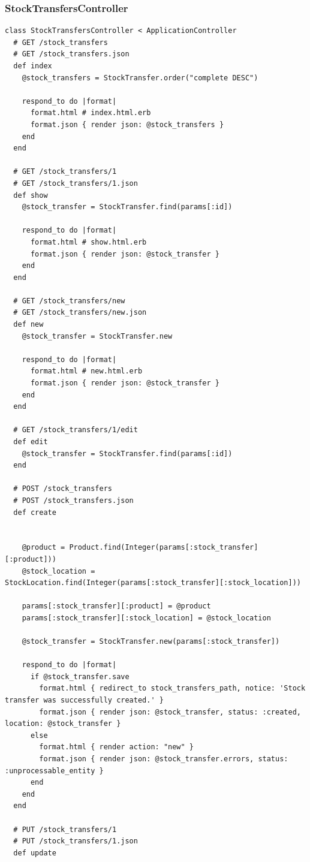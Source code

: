 \documentclass[a4paper]{article}
\begin{document}
\subsubsection{StockTransfersController}
\begin{verbatim}
class StockTransfersController < ApplicationController
  # GET /stock_transfers
  # GET /stock_transfers.json
  def index
    @stock_transfers = StockTransfer.order("complete DESC")

    respond_to do |format|
      format.html # index.html.erb
      format.json { render json: @stock_transfers }
    end
  end

  # GET /stock_transfers/1
  # GET /stock_transfers/1.json
  def show
    @stock_transfer = StockTransfer.find(params[:id])

    respond_to do |format|
      format.html # show.html.erb
      format.json { render json: @stock_transfer }
    end
  end

  # GET /stock_transfers/new
  # GET /stock_transfers/new.json
  def new
    @stock_transfer = StockTransfer.new

    respond_to do |format|
      format.html # new.html.erb
      format.json { render json: @stock_transfer }
    end
  end

  # GET /stock_transfers/1/edit
  def edit
    @stock_transfer = StockTransfer.find(params[:id])
  end

  # POST /stock_transfers
  # POST /stock_transfers.json
  def create
    

    @product = Product.find(Integer(params[:stock_transfer][:product]))
    @stock_location = StockLocation.find(Integer(params[:stock_transfer][:stock_location]))

    params[:stock_transfer][:product] = @product
    params[:stock_transfer][:stock_location] = @stock_location

    @stock_transfer = StockTransfer.new(params[:stock_transfer])

    respond_to do |format|
      if @stock_transfer.save
        format.html { redirect_to stock_transfers_path, notice: 'Stock transfer was successfully created.' }
        format.json { render json: @stock_transfer, status: :created, location: @stock_transfer }
      else
        format.html { render action: "new" }
        format.json { render json: @stock_transfer.errors, status: :unprocessable_entity }
      end
    end
  end

  # PUT /stock_transfers/1
  # PUT /stock_transfers/1.json
  def update


\end{verbatim}
\end{document}
